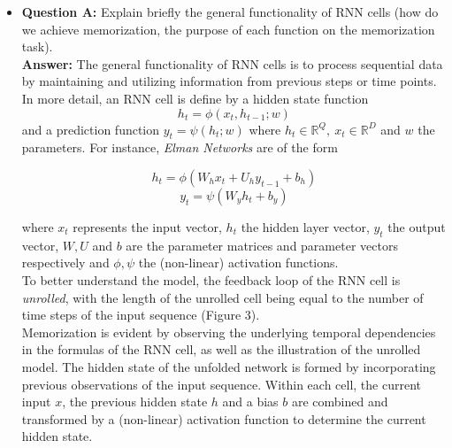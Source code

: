 \documentclass{article}
\begin{document}
\begin{itemize}
	\item \textbf{Question A:} Explain briefly the general functionality of RNN cells (how do we achieve memorization, the purpose of each function on the memorization task). \\
	
	\textbf{Answer:} The general functionality of RNN cells is to process sequential data by maintaining and utilizing information from previous steps or time points. In more detail, an RNN cell is define by a hidden state function $$h_t = \phi(x_t, h_{t-1};w)$$ and a prediction function $y_t = \psi(h_t;w)$ where $h_t \in \mathbb{R}^Q, ~x_t \in \mathbb{R}^D$ and $w$ the parameters. For instance, \textit{Elman Networks} are of the form
	
	$$ h_t = \phi (W_{h} x_t + U_{h} y_{t-1} + b_h) $$
	$$ y_t = \psi (W_{y} h_t + b_y) $$
	
	where $x_t$ represents the input vector, $h_t$ the hidden layer vector, $y_t$ the output vector, $W,U$ and $b$ are the parameter matrices and parameter vectors respectively and $\phi,\psi$ the (non-linear) activation functions. \\
	
	To better understand the model, the feedback loop of the RNN cell is \textit{unrolled}, with the length of the unrolled cell being equal to the number of time steps of the input sequence (Figure 3). \\
	
	Memorization is evident by observing the underlying temporal dependencies in the formulas of the RNN cell, as well as the illustration of the unrolled model. The hidden state of the unfolded network is formed by incorporating previous observations of the input sequence. Within each cell, the current input $x$, the previous hidden state $h$ and a bias $b$ are combined and transformed by a (non-linear) activation function to determine the current hidden state.
	
	

\end{itemize}
\end{document}
